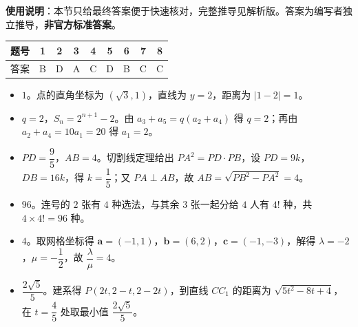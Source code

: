 
\begin{gknotice}
\textbf{使用说明}：本节只给最终答案便于快速核对，完整推导见解析版。答案为编写者独立推导，\textbf{非官方标准答案}。
\end{gknotice}

\begin{center}\begin{tabular}{ccccccccc}
\toprule
题号 & 1 & 2 & 3 & 4 & 5 & 6 & 7 & 8 \\
\midrule
答案 & B & D & A & C & D & B & C & C \\
\bottomrule
\end{tabular}\end{center}

\begin{itemize}[leftmargin=2.6em]
  \item[\textbf{9.}] $1$。点的直角坐标为 $(\sqrt3,1)$，直线为 $y=2$，距离为 $|1-2|=1$。
  \item[\textbf{10.}] $q=2$，$S_n=2^{n+1}-2$。由 $a_3+a_5=q(a_2+a_4)$ 得 $q=2$；再由 $a_2+a_4=10a_1=20$ 得 $a_1=2$。
  \item[\textbf{11.}] $PD=\dfrac95$，$AB=4$。切割线定理给出 $PA^2=PD\cdot PB$，设 $PD=9k$，$DB=16k$，得 $k=\dfrac15$；又 $PA\perp AB$，故 $AB=\sqrt{PB^2-PA^2}=4$。
  \item[\textbf{12.}] $96$。连号的 $2$ 张有 $4$ 种选法，与其余 $3$ 张一起分给 $4$ 人有 $4!$ 种，共 $4\times4!=96$ 种。
  \item[\textbf{13.}] $4$。取网格坐标得 $\boldsymbol a=(-1,1)$，$\boldsymbol b=(6,2)$，$\boldsymbol c=(-1,-3)$，解得 $\lambda=-2$，$\mu=-\dfrac12$，故 $\dfrac{\lambda}{\mu}=4$。
  \item[\textbf{14.}] $\dfrac{2\sqrt5}5$。建系得 $P(2t,2-t,2-2t)$，到直线 $CC_1$ 的距离为 $\sqrt{5t^2-8t+4}$，在 $t=\dfrac45$ 处取最小值 $\dfrac{2\sqrt5}5$。
\end{itemize}


